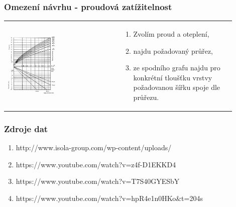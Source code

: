 \documentclass{beamer}
\begin{document}
\begin{frame}
	\frametitle{Omezení návrhu - proudová zatížitelnost}
	
	\begin{center}
		\begin{tabular}{m{0.45\linewidth} m{0.45\linewidth}}
		 \includegraphics[width=0.45\textwidth]{track-width.png} &
			
			\begin{enumerate}
				\item Zvolím proud a oteplení,
				\item najdu požadovaný průřez,
				\item ze spodního grafu najdu pro konkrétní tloušťku vrstvy požadovanou šířku spoje dle průřezu.
			\end{enumerate}
		\end{tabular}
	\end{center}
	
\end{frame}
\begin{frame}
	\frametitle{Zdroje dat}

	\begin{enumerate}
		\item http://www.isola-group.com/wp-content/uploads/
		\item https://www.youtube.com/watch?v=z4f-D1EKKD4
		\item https://www.youtube.com/watch?v=T7S40GYESbY
		\item https://www.youtube.com/watch?v=hpR4e1n0HKo\&t=204s
	\end{enumerate}
\end{frame}
\end{document}
